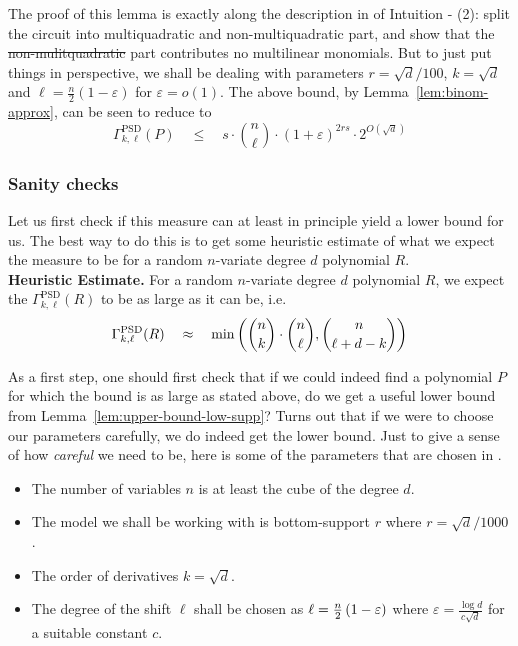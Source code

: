 \documentclass{beatcs}
\newcommand{\spaced}[1]{\quad#1\quad}
\renewcommand{\epsilon}{\varepsilon}
\providecommand{\DIFaddtex}[1]{{\protect\color{blue}\uwave{#1}}} %
\providecommand{\DIFdeltex}[1]{{\protect\color{red}\sout{#1}}}                      %
\providecommand{\DIFaddbegin}{} %
\providecommand{\DIFaddend}{} %
\providecommand{\DIFdelbegin}{} %
\providecommand{\DIFdelend}{} %
\providecommand{\DIFadd}[1]{\texorpdfstring{\DIFaddtex{#1}}{#1}} %
\providecommand{\DIFdel}[1]{\texorpdfstring{\DIFdeltex{#1}}{}} %
\begin{document}
The proof of this lemma is exactly along the description in of Intuition - (2): split the circuit into multiquadratic and non-multiquadratic part, and show that the \DIFdelbegin \DIFdel{non-mulitquadratic }\DIFdelend \DIFaddbegin \DIFadd{non-multiquadratic }\DIFaddend part contributes no multilinear monomials. But to just put things in perspective, we shall be dealing with parameters $r = \sqrt{d}/100$, $k = \sqrt{d}$ and $\ell = \frac{n}{2}(1 - \epsilon)$ for $\epsilon = o(1)$. The above bound, by Lemma~\ref{lem:binom-approx}, can be seen to reduce to
\[
\Gamma^{\mathrm{PSD}}_{k,\ell}(P) \quad \leq \quad s \cdot \binom{n}{\ell} \cdot (1+\epsilon)^{2rs} \cdot 2^{O(\sqrt{d})}
\]


\subsubsection*{Sanity checks}

Let us first check if this measure can at least in principle yield a lower bound for us. The best way to do this is to get some heuristic estimate of what we expect the measure to be for a random $n$-variate degree $d$ polynomial $R$. \\

{\bf Heuristic Estimate. } For a random $n$-variate degree $d$ polynomial $R$, we expect the $\Gamma^{\mathrm{PSD}}_{k,\ell}(R)$ to be as large as it can be, i.e.
\[
\Gamma^{\mathrm{PSD}}_{k,\ell}(R) \spaced{\approx} \min\inparen{\binom{n}{k}\cdot \binom{n}{\ell}, \binom{n}{\ell + d-k}}
\]

As a first step, one should first check that if we could indeed find a polynomial $P$ for which the bound is as large as stated above, do we get a useful lower bound from Lemma~\ref{lem:upper-bound-low-supp}? Turns out that if we were to choose our parameters carefully, we do indeed get the lower bound. Just to give a sense of how \emph{careful} we need to be, here is some of the parameters that are chosen in \cite{KLSS,KS14}. 

\begin{itemize}
\item The number of variables $n$ is at least the cube of the degree $d$. 
\item The model we shall be working with is bottom-support $r$ where $r = \sqrt{d}/1000$. 
\item The order of derivatives $k = \sqrt{d}$. 
\item The degree of the shift $\ell$ shall be chosen as $\ell = \frac{n}{2}\inparen{1 - \epsilon}$ where $\epsilon = \frac{\log d}{c\sqrt{d}}$ for a suitable constant $c$. 
\end{itemize}
\end{document}

